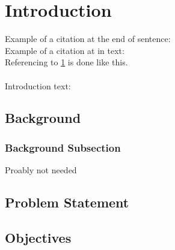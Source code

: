 \chapter{Introduction}\label{chapter:introduction} 

Example of a citation at the end of sentence: \autocite{testcite} \\
Example of a citation at in text: \textcite{testcite} \\
Referencing to \cref{chapter:introduction} is done like this. 
\\\\
Introduction text: 



\section{Background}\label{section:background}


\subsection{Background Subsection}
Proably not needed



\section{Problem Statement}\label{section:problem_statement}


\section{Objectives}\label{section:objectives}

